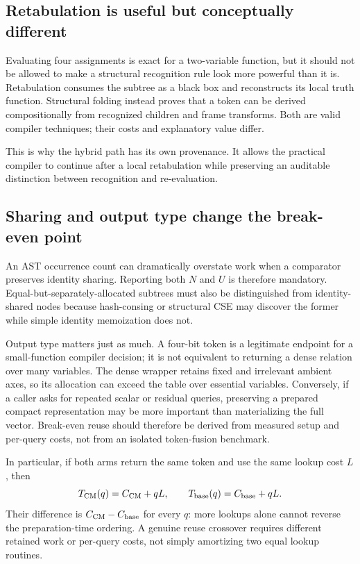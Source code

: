 \documentclass[10pt]{article}
\theoremstyle{plain}
\theoremstyle{definition}
\theoremstyle{remark}
\begin{document}
\subsection{Retabulation is useful but conceptually different}

Evaluating four assignments is exact for a two-variable function, but it should not be allowed to make a structural recognition rule look more powerful than it is. Retabulation consumes the subtree as a black box and reconstructs its local truth function. Structural folding instead proves that a token can be derived compositionally from recognized children and frame transforms. Both are valid compiler techniques; their costs and explanatory value differ.

This is why the hybrid path has its own provenance. It allows the practical compiler to continue after a local retabulation while preserving an auditable distinction between recognition and re-evaluation.

\subsection{Sharing and output type change the break-even point}

An AST occurrence count can dramatically overstate work when a comparator preserves identity sharing. Reporting both $N$ and $U$ is therefore mandatory. Equal-but-separately-allocated subtrees must also be distinguished from identity-shared nodes because hash-consing or structural CSE may discover the former while simple identity memoization does not.

Output type matters just as much. A four-bit token is a legitimate endpoint for a small-function compiler decision; it is not equivalent to returning a dense relation over many variables. The dense wrapper retains fixed and irrelevant ambient axes, so its allocation can exceed the table over essential variables. Conversely, if a caller asks for repeated scalar or residual queries, preserving a prepared compact representation may be more important than materializing the full vector. Break-even reuse should therefore be derived from measured setup and per-query costs, not from an isolated token-fusion benchmark.

In particular, if both arms return the same token and use the same lookup cost $L$, then
\[
 T_{\rm CM}(q)=C_{\rm CM}+qL,\qquad
 T_{\rm base}(q)=C_{\rm base}+qL.
\]
Their difference is $C_{\rm CM}-C_{\rm base}$ for every $q$: more lookups alone cannot reverse the preparation-time ordering. A genuine reuse crossover requires different retained work or per-query costs, not simply amortizing two equal lookup routines.
\end{document}
